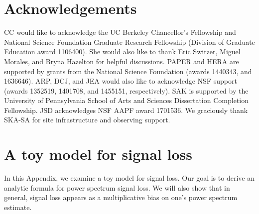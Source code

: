 \documentclass[preprint2,numberedappendix,tighten]{aastex6}  %
\begin{document}

\section{Acknowledgements}
CC would like to acknowledge the UC Berkeley Chancellor's Fellowship and National Science Foundation Graduate Research 
Fellowship (Division of Graduate Education award 1106400). She would also like to thank Eric Switzer, Miguel Morales, and Bryna Hazelton for helpful discussions. PAPER and HERA 
are supported by grants from the National Science Foundation (awards 1440343, and 1636646). ARP, DCJ, and JEA would 
also like to acknowledge NSF support (awards 1352519, 1401708, and 1455151, respectively). SAK is supported by the University of Pennsylvania School of Arts and Sciences Dissertation Completion Fellowship. JSD acknowledges NSF AAPF
award 1701536. We graciously thank SKA-SA for site infrastructure and observing support.
\label{sec:Ack}


\appendix
\section{A toy model for signal loss}
\label{sec:sigloss_appendix}

In this Appendix, we examine a toy model for signal loss. Our goal is to derive an analytic formula for power spectrum signal loss. We will also show that in general, signal loss appears as a multiplicative bias on one's power spectrum estimate.
\end{document}
